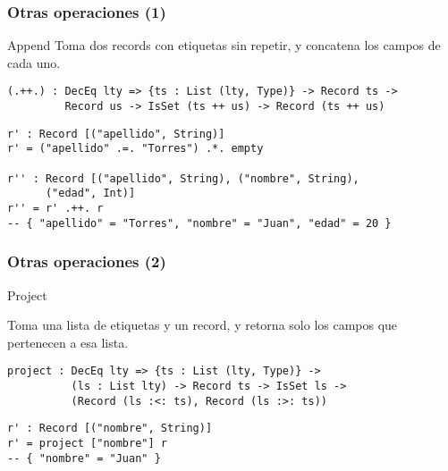 \documentclass{beamer}
\begin{document}
\begin{frame}[fragile]
\frametitle{Otras operaciones (1)}

\begin{block}{Append}
Toma dos records con etiquetas sin repetir, y concatena los campos de cada uno.

\begin{example}
\begin{verbatim}
(.++.) : DecEq lty => {ts : List (lty, Type)} -> Record ts -> 
         Record us -> IsSet (ts ++ us) -> Record (ts ++ us)
\end{verbatim}
\end{example}

\begin{example}[Ejemplo]
\begin{verbatim}
r' : Record [("apellido", String)]
r' = ("apellido" .=. "Torres") .*. empty

r'' : Record [("apellido", String), ("nombre", String), 
      ("edad", Int)]
r'' = r' .++. r
-- { "apellido" = "Torres", "nombre" = "Juan", "edad" = 20 }
\end{verbatim}
\end{example}

\end{block}

\end{frame}

\begin{frame}[fragile]
\frametitle{Otras operaciones (2)}

\begin{block}{Project}

Toma una lista de etiquetas y un record, y retorna solo los campos que pertenecen a esa lista.

\begin{example}
\begin{verbatim}
project : DecEq lty => {ts : List (lty, Type)} -> 
          (ls : List lty) -> Record ts -> IsSet ls -> 
          (Record (ls :<: ts), Record (ls :>: ts))
\end{verbatim}
\end{example}

\begin{example}[Ejemplo]
\begin{verbatim}
r' : Record [("nombre", String)]
r' = project ["nombre"] r
-- { "nombre" = "Juan" }
\end{verbatim}
\end{example}

\end{block}
\end{frame}
\end{document}
